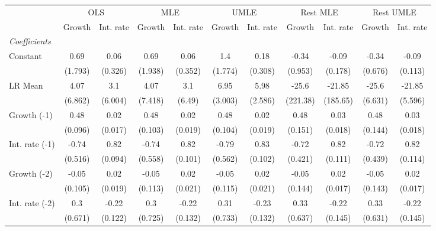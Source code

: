 \begin{table}[htbp] 
	\centering
	\begin{tabular}{@{\extracolsep{4pt}}lcccccccccc@{}}		\hline\hline
		 		 & \multicolumn{2}{c}{OLS} &\multicolumn{2}{c}{MLE} &\multicolumn{2}{c}{UMLE} &\multicolumn{2}{c}{Rest MLE} &\multicolumn{2}{c}{Rest UMLE} \\ 
 		 & Growth 	 & Int. rate 	 & Growth 	 & Int. rate 	 & Growth 	 & Int. rate 	 & Growth 	 & Int. rate 	 & Growth 	 & Int. rate\\\cline{2-3}\cline{4-5}\cline{6-7}\cline{8-9}\cline{10-11}
\rule{0pt}{4ex} 
 \emph{Coefficients} 	  		 & 		 & 		 & 		 & 		 & 		 & 		 & 		 & 		 & 		 &\\ 
\quad Constant 	 & 0.69 	 & 0.06 	 & 0.69 	 & 0.06 	 & 1.4 	 & 0.18 	 & -0.34 	 & -0.09 	 & -0.34 	 & -0.09	 \\ 
 		 & (1.793) 	 & (0.326) 	 & (1.938) 	 & (0.352) 	 & (1.774) 	 & (0.308) 	 & (0.953) 	 & (0.178) 	 & (0.676) 	 & (0.113) 	 \\ 
\quad LR Mean 	 & 4.07 	 & 3.1 	 & 4.07 	 & 3.1 	 & 6.95 	 & 5.98 	 & -25.6 	 & -21.85 	 & -25.6 	 & -21.85	 \\ 
 		 & (6.862) 	 & (6.004) 	 & (7.418) 	 & (6.49) 	 & (3.003) 	 & (2.586) 	 & (221.38) 	 & (185.65) 	 & (6.631) 	 & (5.596) 	 \\ 
\quad Growth (-1) 	 &0.48 	 & 0.02 	 & 0.48 	 & 0.02 	 & 0.48 	 & 0.02 	 & 0.48 	 & 0.03 	 & 0.48 	 & 0.03	 \\ 
 		 & (0.096) 	 & (0.017) 	 & (0.103) 	 & (0.019) 	 & (0.104) 	 & (0.019) 	 & (0.151) 	 & (0.018) 	 & (0.144) 	 & (0.018) 	 \\ 
\quad Int. rate (-1) 	 &-0.74 	 & 0.82 	 & -0.74 	 & 0.82 	 & -0.79 	 & 0.83 	 & -0.72 	 & 0.82 	 & -0.72 	 & 0.82	 \\ 
 		 & (0.516) 	 & (0.094) 	 & (0.558) 	 & (0.101) 	 & (0.562) 	 & (0.102) 	 & (0.421) 	 & (0.111) 	 & (0.439) 	 & (0.114) 	 \\ 
\quad Growth (-2) 	 &-0.05 	 & 0.02 	 & -0.05 	 & 0.02 	 & -0.05 	 & 0.02 	 & -0.05 	 & 0.02 	 & -0.05 	 & 0.02	 \\ 
 		 & (0.105) 	 & (0.019) 	 & (0.113) 	 & (0.021) 	 & (0.115) 	 & (0.021) 	 & (0.144) 	 & (0.017) 	 & (0.143) 	 & (0.017) 	 \\ 
\quad Int. rate (-2) 	 &0.3 	 & -0.22 	 & 0.3 	 & -0.22 	 & 0.31 	 & -0.23 	 & 0.33 	 & -0.22 	 & 0.33 	 & -0.22	 \\ 
 		 & (0.671) 	 & (0.122) 	 & (0.725) 	 & (0.132) 	 & (0.733) 	 & (0.132) 	 & (0.637) 	 & (0.145) 	 & (0.631) 	 & (0.145) 	 \\ 

\end{tabular}
\end{table}
